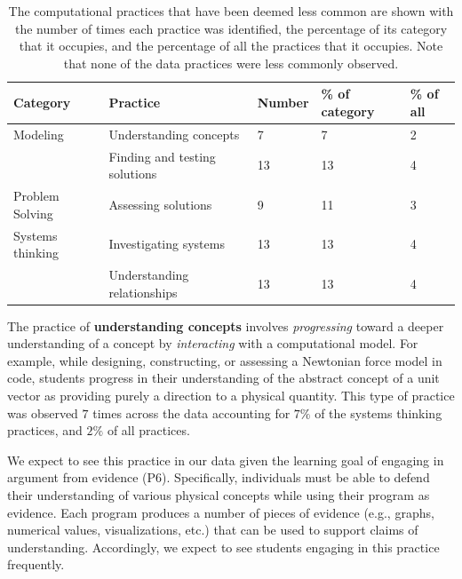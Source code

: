\documentclass{msuphddissertation}
\begin{document}
\begin{doublespace}
\begin{table}[ht]\centering
\begin{tabular}{lllll}\hline\hline
Category & Practice & Number & \% of category & \% of all \\\hline
Modeling & Understanding concepts & 7 & 7 & 2 \\
 & Finding and testing solutions & 13 & 13 & 4 \\\hline
Problem Solving & Assessing solutions & 9 & 11 & 3 \\\hline
Systems thinking & Investigating systems & 13 & 13 & 4 \\
 & Understanding relationships & 13 & 13 & 4 \\\hline\hline
\end{tabular}
\caption{The computational practices that have been deemed less common are shown with the number of times each practice was identified, the percentage of its category that it occupies, and the percentage of all the practices that it occupies.  Note that none of the data practices were less commonly observed.}\label{CH6:LessCommon}
\end{table}

%
%
%

The practice of \textbf{understanding concepts} involves \textit{progressing} toward a deeper understanding of a concept by \textit{interacting} with a computational model.  For example, while designing, constructing, or assessing a Newtonian force model in code, students progress in their understanding of the abstract concept of a unit vector as providing purely a direction to a physical quantity.  This type of practice was observed $7$ times across the data  accounting for $7\%$ of the systems thinking practices, and $2\%$ of all practices.

We expect to see this practice in our data given the learning goal of engaging in argument from evidence (P6).  Specifically, individuals must be able to defend their understanding of various physical concepts while using their program as evidence.  Each program produces a number of pieces of evidence (e.g., graphs, numerical values, visualizations, etc.) that can be used to support claims of understanding.  Accordingly, we expect to see students engaging in this practice frequently.


\end{doublespace}
\end{document}
